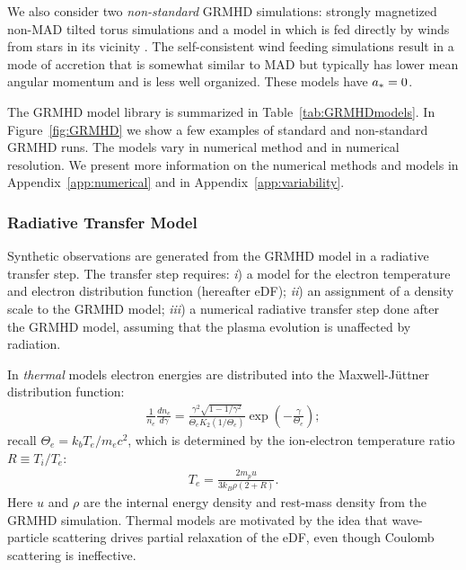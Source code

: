 We also consider two {\it non-standard} GRMHD simulations: strongly magnetized non-MAD tilted torus simulations \citep{ref} and a model in which \sgra is fed directly by winds from stars in its vicinity \citep{2020ApJ...896L...6R}. The self-consistent wind feeding simulations result in a mode of accretion that is somewhat similar to MAD but typically has lower mean angular momentum and is less well organized.
These models have $a_* = 0$.

The GRMHD model library is summarized in Table~\ref{tab:GRMHDmodels}. In Figure~\ref{fig:GRMHD} we show a few examples of standard and non-standard GRMHD runs. The models vary in numerical method and in numerical resolution. We present more information on the numerical methods and models in Appendix~\ref{app:numerical} and in  Appendix~\ref{app:variability}.

\subsubsection{Radiative Transfer Model}

Synthetic observations are generated from the GRMHD model in a radiative transfer step.
The transfer step requires: %
\emph{i}) a model for the electron temperature and electron distribution function (hereafter eDF); 
\emph{ii}) an assignment of a density scale to the GRMHD model;
\emph{iii}) a numerical radiative transfer step done after the GRMHD model, assuming that the plasma evolution is unaffected by radiation.


In {\it thermal} models electron energies are distributed into the Maxwell-J{\"u}ttner distribution function:
\begin{align}
\frac{1}{n_e}\frac{dn_e}{d\gamma}= \frac{\gamma^2 \sqrt{1-1/\gamma^2}} {\Theta_e K_2(1/\Theta_e)} \exp\left(-\frac{\gamma}{\Theta_e}\right);
\end{align}
recall $\Theta_e=k_b T_e/m_e c^2$, which is determined by the ion-electron temperature ratio $R \equiv T_i/T_e$:
\begin{align}
T_e=\frac{2 m_p u}{3 k_B \rho (2+R)}.
\end{align}
Here $u$ and $\rho$ are the internal energy density and rest-mass density from the GRMHD simulation.  Thermal models are motivated by the idea that wave-particle scattering drives partial relaxation of the eDF, even though Coulomb scattering is ineffective.

